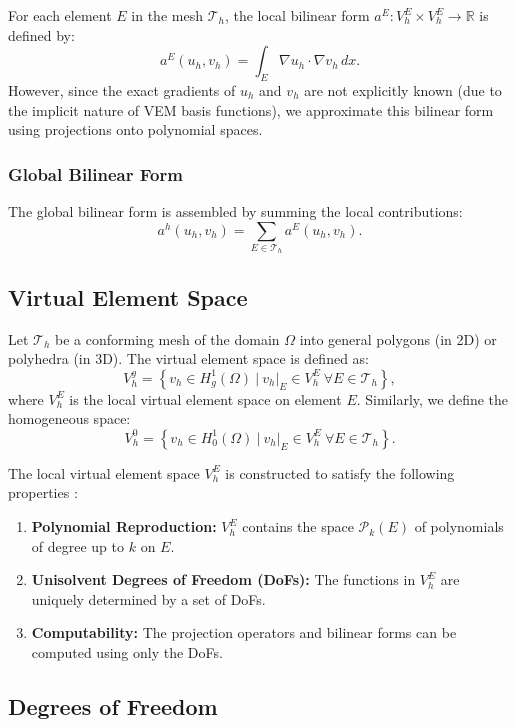 \documentclass[class=article, crop=false]{standalone}
\begin{document}
For each element $E$ in the mesh $\mathcal{T}_h$, the local bilinear form $a^E: V_h^E \times V_h^E \rightarrow \mathbb{R}$ is defined by:
\[
a^E(u_h, v_h) = \int_E \nabla u_h \cdot \nabla v_h \, dx.
\]
However, since the exact gradients of $u_h$ and $v_h$ are not explicitly known (due to the implicit nature of VEM basis functions), we approximate this bilinear form using projections onto polynomial spaces.

\subsubsection{Global Bilinear Form}

The global bilinear form is assembled by summing the local contributions:
\[
a^h(u_h, v_h) = \sum_{E \in \mathcal{T}_h} a^E(u_h, v_h).
\]

\subsection{Virtual Element Space}

Let $\mathcal{T}_h$ be a conforming mesh of the domain $\Omega$ into general polygons (in 2D) or polyhedra (in 3D). The virtual element space is defined as:
\[
V_h^g = \left\{ v_h \in H^1_g(\Omega) \ \big| \ v_h|_E \in V_h^E \ \forall E \in \mathcal{T}_h \right\},
\]
where $V_h^E$ is the local virtual element space on element $E$. Similarly, we define the homogeneous space:
\[
V_h^0 = \left\{ v_h \in H^1_0(\Omega) \ \big| \ v_h|_E \in V_h^E \ \forall E \in \mathcal{T}_h \right\}.
\]

The local virtual element space $V_h^E$ is constructed to satisfy the following properties \cite{beirao2014hitchhiker}:
\begin{enumerate}
    \item \textbf{Polynomial Reproduction:} $V_h^E$ contains the space $\mathcal{P}_k(E)$ of polynomials of degree up to $k$ on $E$.
    \item \textbf{Unisolvent Degrees of Freedom (DoFs):} The functions in $V_h^E$ are uniquely determined by a set of DoFs.
    \item \textbf{Computability:} The projection operators and bilinear forms can be computed using only the DoFs.
\end{enumerate}

\subsection{Degrees of Freedom}
\end{document}
